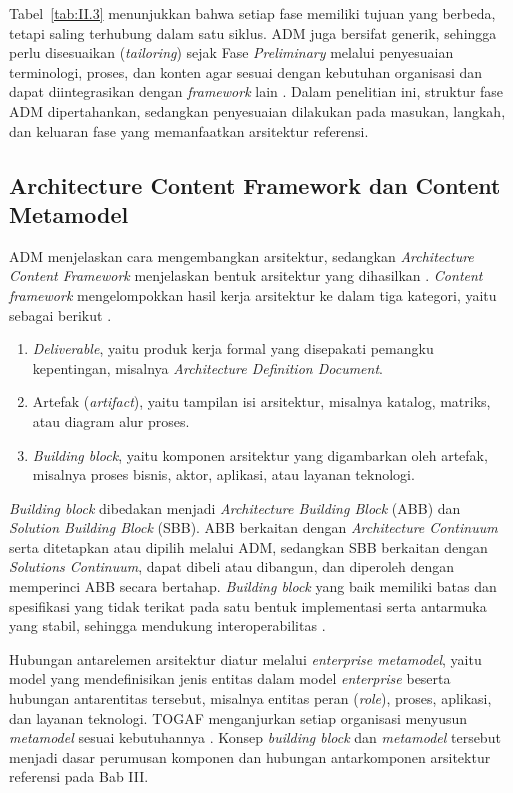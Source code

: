 Tabel~\ref{tab:II.3} menunjukkan bahwa setiap fase memiliki tujuan yang berbeda, tetapi saling terhubung dalam satu siklus. ADM juga bersifat generik, sehingga perlu disesuaikan (\textit{tailoring}) sejak Fase \textit{Preliminary} melalui penyesuaian terminologi, proses, dan konten agar sesuai dengan kebutuhan organisasi dan dapat diintegrasikan dengan \textit{framework} lain \cite{TOGAF2022}. Dalam penelitian ini, struktur fase ADM dipertahankan, sedangkan penyesuaian dilakukan pada masukan, langkah, dan keluaran fase yang memanfaatkan arsitektur referensi.

\subsection{Architecture Content Framework dan Content Metamodel}
\label{sec:II.4.3}

ADM menjelaskan cara mengembangkan arsitektur, sedangkan \textit{Architecture Content Framework} menjelaskan bentuk arsitektur yang dihasilkan \cite{TOGAF2022}. \textit{Content framework} mengelompokkan hasil kerja arsitektur ke dalam tiga kategori, yaitu sebagai berikut \cite{TOGAF2022}.

\begin{enumerate}[label=\arabic*.]
\item \textit{Deliverable}, yaitu produk kerja formal yang disepakati pemangku kepentingan, misalnya \textit{Architecture Definition Document}.
\item Artefak (\textit{artifact}), yaitu tampilan isi arsitektur, misalnya katalog, matriks, atau diagram alur proses.
\item \textit{Building block}, yaitu komponen arsitektur yang digambarkan oleh artefak, misalnya proses bisnis, aktor, aplikasi, atau layanan teknologi.
\end{enumerate}

\textit{Building block} dibedakan menjadi \textit{Architecture Building Block} (ABB\label{sk:ABB}) dan \textit{Solution Building Block} (SBB\label{sk:SBB}). ABB berkaitan dengan \textit{Architecture Continuum} serta ditetapkan atau dipilih melalui ADM, sedangkan SBB berkaitan dengan \textit{Solutions Continuum}, dapat dibeli atau dibangun, dan diperoleh dengan memperinci ABB secara bertahap. \textit{Building block} yang baik memiliki batas dan spesifikasi yang tidak terikat pada satu bentuk implementasi serta antarmuka yang stabil, sehingga mendukung interoperabilitas \cite{TOGAF2022}.

Hubungan antarelemen arsitektur diatur melalui \textit{enterprise metamodel}, yaitu model yang mendefinisikan jenis entitas dalam model \textit{enterprise} beserta hubungan antarentitas tersebut, misalnya entitas peran (\textit{role}), proses, aplikasi, dan layanan teknologi. TOGAF menganjurkan setiap organisasi menyusun \textit{metamodel} sesuai kebutuhannya \cite{TOGAF2022}. Konsep \textit{building block} dan \textit{metamodel} tersebut menjadi dasar perumusan komponen dan hubungan antarkomponen arsitektur referensi pada Bab III.

